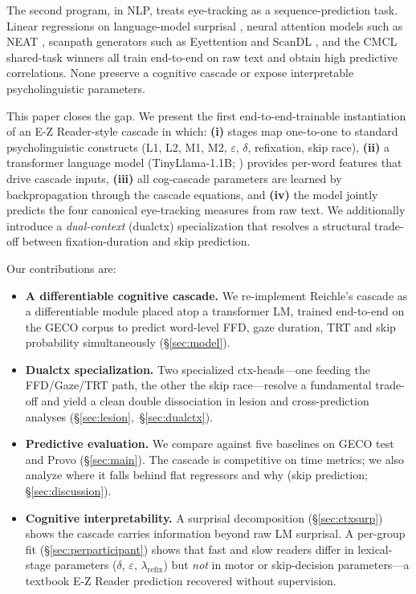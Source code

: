 \documentclass[11pt]{article}
\begin{document}
The second program, in NLP, treats eye-tracking as a sequence-prediction task. Linear regressions on language-model surprisal \citep{smith2013surprisal,goodkind2018predictive}, neural attention models such as NEAT \citep{hahn2016neat,hahn2022neat}, scanpath generators such as Eyettention \citep{deng2023eyettention} and ScanDL \citep{bolliger2023scandl,bolliger2025scandl2}, and the CMCL shared-task winners \citep{hollenstein2021cmcl} all train end-to-end on raw text and obtain high predictive correlations. None preserve a cognitive cascade or expose interpretable psycholinguistic parameters.

This paper closes the gap. We present the first end-to-end-trainable instantiation of an E-Z Reader-style cascade in which: \textbf{(i)} stages map one-to-one to standard psycholinguistic constructs (L1, L2, M1, M2, $\varepsilon$, $\delta$, refixation, skip race), \textbf{(ii)} a transformer language model (TinyLlama-1.1B; \citealp{zhang2024tinyllama}) provides per-word features that drive cascade inputs, \textbf{(iii)} all cog-cascade parameters are learned by backpropagation through the cascade equations, and \textbf{(iv)} the model jointly predicts the four canonical eye-tracking measures from raw text. We additionally introduce a \emph{dual-context} (dualctx) specialization that resolves a structural trade-off between fixation-duration and skip prediction.

Our contributions are:

\begin{itemize}
\item \textbf{A differentiable cognitive cascade.} We re-implement Reichle's cascade as a differentiable module placed atop a transformer LM, trained end-to-end on the GECO corpus to predict word-level FFD, gaze duration, TRT and skip probability simultaneously (\S\ref{sec:model}).
\item \textbf{Dualctx specialization.} Two specialized ctx-heads---one feeding the FFD/Gaze/TRT path, the other the skip race---resolve a fundamental trade-off and yield a clean double dissociation in lesion and cross-prediction analyses (\S\ref{sec:lesion},~\S\ref{sec:dualctx}).
\item \textbf{Predictive evaluation.} We compare against five baselines on GECO test and Provo \citep{cop2017geco,luke2018provo} (\S\ref{sec:main}). The cascade is competitive on time metrics; we also analyze where it falls behind flat regressors and why (skip prediction; \S\ref{sec:discussion}).
\item \textbf{Cognitive interpretability.} A surprisal decomposition (\S\ref{sec:ctxsurp}) shows the cascade carries information beyond raw LM surprisal. A per-group fit (\S\ref{sec:perparticipant}) shows that fast and slow readers differ in lexical-stage parameters ($\delta$, $\varepsilon$, $\lambda_{\text{refix}}$) but \emph{not} in motor or skip-decision parameters---a textbook E-Z Reader prediction recovered without supervision.
\end{itemize}
\end{document}
